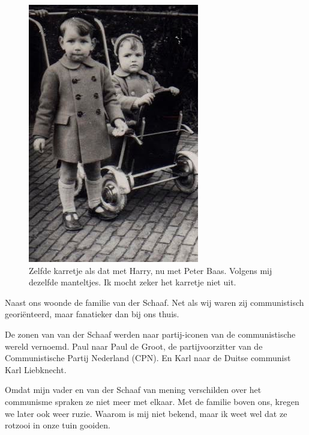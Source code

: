 \documentclass[12pt,twoside]{memoir}
\begin{document}
\begin{figure}
\includegraphics[width=\textwidth]{img/ch5/peterme}
\caption*{\footnotesize Zelfde karretje als dat met Harry, nu met Peter Baas. Volgens mij dezelfde manteltjes. Ik mocht zeker het karretje niet uit.}
\end{figure}

Naast ons woonde de familie van der Schaaf. Net als wij waren zij communistisch georiënteerd, maar fanatieker dan bij ons thuis. 

De zonen van van der Schaaf werden naar partij-iconen van de communistische wereld vernoemd. Paul naar Paul de Groot, de partijvoorzitter van de Communistische Partij Nederland (CPN). En Karl naar de Duitse communist Karl Liebknecht. 

Omdat mijn vader en van der Schaaf van mening verschilden over het communisme spraken ze niet meer met elkaar. Met de familie boven ons, kregen we later ook weer ruzie. Waarom is mij niet bekend, maar ik weet wel dat ze rotzooi in onze tuin gooiden. 
\end{document}

